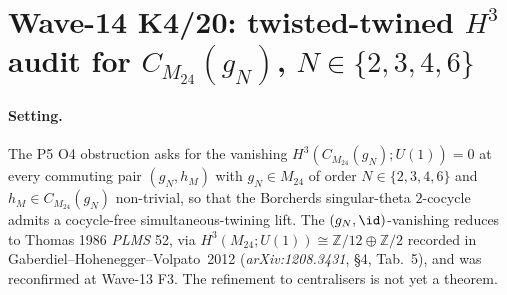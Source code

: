 
\providecommand{\Mtf}{M_{24}}
\providecommand{\cent}{C_{\Mtf}}
\providecommand{\Res}{\mathrm{Res}}
\providecommand{\Inf}{\mathrm{Inf}}
\providecommand{\tr}{\mathrm{tr}}
\providecommand{\ker}{\mathrm{ker}}
\providecommand{\Image}{\mathrm{im}}
\providecommand{\Ext}{\mathrm{Ext}}
\providecommand{\ClaimStatusConjectured}{\textsc{(conjectural)}}
\providecommand{\ClaimStatusOpen}{\textsc{(open)}}
\providecommand{\ClaimStatusTheorem}{\textsc{(theorem)}}
\providecommand{\kBKM}{\kappa_{\mathrm{BKM}}}
\providecommand{\kch}{\kappa_{\mathrm{ch}}}

\section*{Wave-14 K4/20: twisted-twined $H^3$ audit for
$\cent(g_N)$, $N\in\{2,3,4,6\}$}
\label{wn:sec:wave14-k4-twisted-twined-H3}

\paragraph{Setting.} The P5 O4 obstruction asks for the
vanishing $H^3(\cent(g_N);U(1))=0$ at every commuting pair
$(g_N,h_M)$ with $g_N\in \Mtf$ of order $N\in\{2,3,4,6\}$
and $h_M\in\cent(g_N)$ non-trivial, so that the Borcherds
singular-theta $2$-cocycle admits a cocycle-free
simultaneous-twining lift. The $(g_N,\id)$-vanishing reduces
to Thomas 1986 \emph{PLMS} 52, via
$H^3(\Mtf;U(1))\cong\mathbb Z/12\oplus\mathbb Z/2$ recorded in
Gaberdiel--Hohenegger--Volpato~2012 (\emph{arXiv:1208.3431},
\S4, Tab.~5), and was reconfirmed at Wave-13 F3. The refinement
to centralisers is not yet a theorem.

